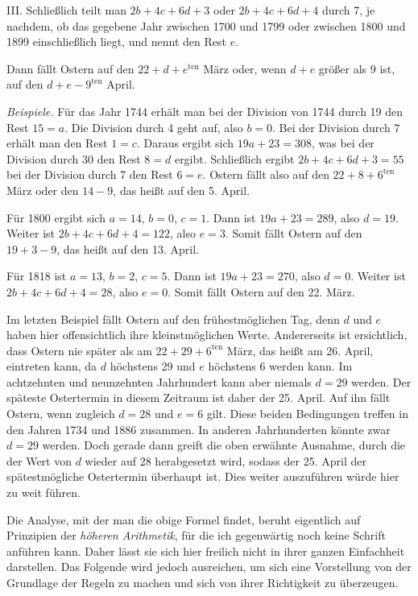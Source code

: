 III. Schließlich teilt man $2b+4c+6d+3$ oder $2b+4c+6d+4$ durch 7, je nachdem, ob das gegebene Jahr zwischen 1700 und 1799 oder zwischen 1800 und 1899 einschließlich liegt, und nennt den Rest $e$.

Dann fällt Ostern auf den $22+d+e^{\mathrm{ten}}$ März oder, wenn $d+e$ größer als 9 ist, auf den $d+e-9^{\mathrm{ten}}$ April.

\textit{Beispiele.} Für das Jahr 1744 erhält man bei der Division von 1744 durch 19 den Rest $15=a$. Die Division durch 4 geht auf, also $b=0$. Bei der Division durch 7 erhält man den Rest $1=c$. Daraus ergibt sich $19a+23=308$, was bei der Division durch 30 den Rest $8=d$ ergibt. Schließlich ergibt $2b+4c+6d+3=55$ bei der Division durch 7 den Rest $6=e$. Ostern fällt also auf den $22+8+6^{\mathrm{ten}}$ März oder den $14-9$, das heißt auf den 5. April.

Für 1800 ergibt sich $a=14$, $b=0$, $c=1$. Dann ist $19a+23=289$, also $d=19$. Weiter ist $2b+4c+6d+4=122$, also $e=3$. Somit fällt Ostern auf den $19+3-9$, das heißt auf den 13. April.

Für 1818 ist $a=13$, $b=2$, $c=5$. Dann ist $19a+23=270$, also $d=0$. Weiter ist $2b+4c+6d+4=28$, also $e=0$. Somit fällt Ostern auf den 22. März.

Im letzten Beispiel fällt Ostern auf den frühestmöglichen Tag, denn $d$ und $e$ haben hier offensichtlich ihre kleinstmöglichen Werte. Andererseits ist ersichtlich, dass Ostern nie später als am $22+29+6^{\mathrm{ten}}$ März, das heißt am 26. April, eintreten kann, da $d$ höchstens 29 und $e$ höchstens 6 werden kann. Im achtzehnten und neunzehnten Jahrhundert kann aber niemals $d=29$ werden. Der späteste Ostertermin in diesem Zeitraum ist daher der 25. April. Auf ihn fällt Ostern, wenn zugleich $d=28$ und $e=6$ gilt. Diese beiden Bedingungen treffen in den Jahren 1734 und 1886 zusammen. In anderen Jahrhunderten könnte zwar $d=29$ werden. %
%
Doch gerade dann greift die oben erwähnte Ausnahme, durch die der Wert von $d$ wieder auf 28 herabgesetzt wird, sodass der 25. April der spätestmögliche Ostertermin überhaupt ist. Dies weiter auszuführen würde hier zu weit führen.

Die Analyse, mit der man die obige Formel findet, beruht eigentlich auf Prinzipien der \textit{höheren Arithmetik}, für die ich gegenwärtig noch keine Schrift anführen kann. Daher lässt sie sich hier freilich nicht in ihrer ganzen Einfachheit darstellen. Das Folgende wird jedoch ausreichen, um sich eine Vorstellung von der Grundlage der Regeln zu machen und sich von ihrer Richtigkeit zu überzeugen.

